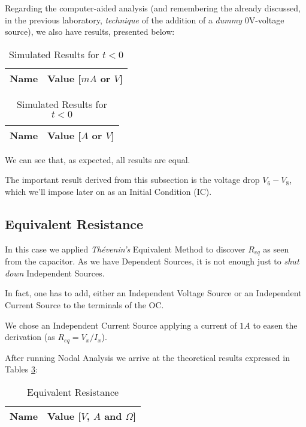 \clearpage

Regarding the computer-aided analysis (and remembering the already discussed, in the previous laboratory, \textit{technique} of the addition of a \textit{dummy} 0V-voltage source), we also have results, presented below:

\begin{table}[h]
\parbox{.5\linewidth}{
  \centering
  \begin{tabular}{|c|c|}
    \hline
    {\bf Name} & {\bf Value [$mA$ or $V$]} \\\hline
    
  \end{tabular}
  \caption{Theoretical Results for $t<0$}
  \label{tab:node_voltages}
  }
  \hfill
  \parbox{.5\textwidth}{
  \centering  
  \begin{tabular}{|c|c|}
    \hline    
    {\bf Name} & {\bf Value [$A$ or $V$]} \\ \hline
    
  \end{tabular}
  \caption{Simulated Results for $t<0$}
  \label{tab:nodal}
  }
  \end{table}

We can see that, as expected, all results are equal.

The important result derived from this subsection is the voltage drop $V_6-V_8$, which we'll impose later on as an Initial Condition (IC).

\subsection{Equivalent Resistance}
\label{subsec:Req}

In this case we applied \textit{Thévenin's} Equivalent Method to discover $R_{eq}$ as seen from the capacitor. As we have Dependent Sources, it is not enough just to \textit{shut down} Independent Sources. 

In fact, one has to add, either an Independent Voltage Source or an Independent Current Source to the terminals of the OC.

We chose an Independent Current Source applying a current of $1 A$ to easen the derivation (as $R_{eq}=V_x/I_x$). 

After running Nodal Analysis we arrive at the theoretical results expressed in Tables \ref{tab:req1}: 


\begin{table}
\centering
 \begin{tabular}{|c|c|}
    \hline
    {\bf Name} & {\bf Value [$V$, $A$ and $\Omega$]} \\\hline
    
  \end{tabular}

  \caption[Equivalent Resitance]{Equivalent Resistance}  
  \label{tab:req1}
\end{table}
\pagebreak

